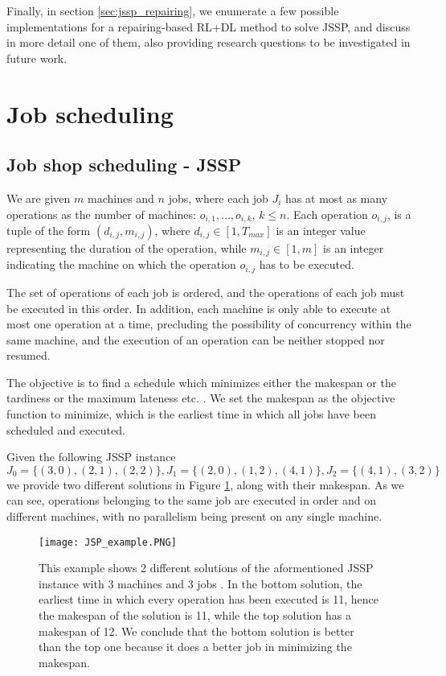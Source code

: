 \documentclass[12pt]{article}
\begin{document}
Finally, in section \ref{sec:jssp_repairing}, we enumerate a few possible implementations for a repairing-based RL+DL method to solve JSSP, and discuss in more detail one of them, also providing research questions to be investigated in future work.

\medbreak
\section{Job scheduling}
\label{sec:jss}
\subsection{Job shop scheduling - JSSP}
We are given $m$ machines and $n$ jobs, where each job $J_i$ has at most as many operations as the number of machines: $o_{i,1},\dots,o_{i,k}$, $k \le n$. Each operation $o_{i,j}$, is a tuple of the form $(d_{i,j}, m_{i,j})$, where $d_{i,j} \in [1,T_{max}]$ is an integer value representing the duration of the operation, 
while $m_{i,j} \in [1,m]$ is an integer indicating the machine on which the operation $o_{i,j}$ has to be executed. 

The set of operations of each job is ordered, and the operations of each job must be executed in this order.
In addition, each machine is only able to execute at most one operation at a time, precluding the possibility of concurrency within the same machine, and the execution of an operation can be neither stopped nor resumed.

The objective is to find a schedule which minimizes either the makespan or the tardiness or the maximum lateness etc. \cite{wikipedia}. We set the makespan as the objective function to minimize, which is the earliest time in which all jobs have been scheduled and executed.

\medbreak
Given the following JSSP instance $$J_0=\{(3,0),(2,1),(2,2)\}, J_1=\{(2,0),(1,2),(4,1)\}, J_2 = \{(4,1),(3,2)\}$$ we provide two different solutions in Figure \ref{img:jsp_example}, along with their makespan. As we can see, operations belonging to the same job are executed in order and on different machines, with no parallelism being present on any single machine.

\begin{figure}[H]
    \centering
    \texttt{[image: JSP\_example.PNG]}
    \caption{This example shows 2 different solutions of the aformentioned JSSP instance with 3 machines and 3 jobs \cite{disjunctive_graph}. In the bottom solution, the earliest time in which every operation has been executed is 11, hence the makespan of the solution is 11, while the top solution has a makespan of 12. We conclude that the bottom solution is better than the top one because it does a better job in minimizing the makespan.}
    \label{img:jsp_example}
\end{figure}
\end{document}
